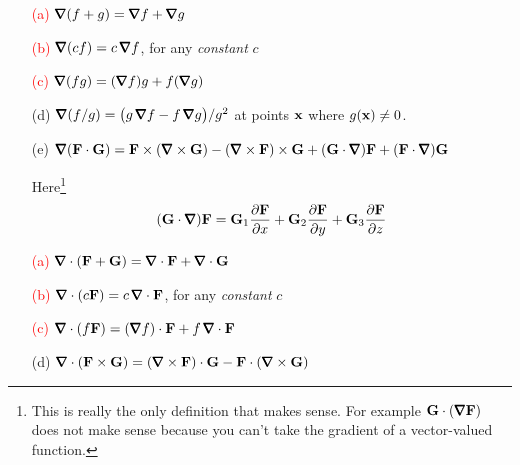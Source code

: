 \begin{theorem}\label{thm:gradIdentities}
\begin{enumerate}
\item[\textcolor{red}{(a)}]
\textcolor{red}{$\vnabla(f+g)=\vnabla f+\vnabla g$}
\item[\textcolor{red}{(b)}]
\textcolor{red}{$\vnabla(cf)=c\,\vnabla f$}, for any \emph{constant} $c$
\item[\textcolor{red}{(c)}]
\textcolor{red}{$\vnabla(fg)=(\vnabla f)g+ f(\vnabla g)$}
\item[(d)]
$\vnabla(f/g)=\big(g\,\vnabla f-f\,\vnabla g\big)/g^2$ at points $\mathbf{x}$
where $g(\mathbf{x})\ne 0$.
\item[(e)]
$\vnabla(\vF\cdot\vG)=\vF\times(\vnabla\times\vG)-
(\vnabla\times\vF)\times\vG+(\vG\cdot\vnabla)\vF+(\vF\cdot\vnabla)\vG$\ \ \ 

Here\footnote{This is really the only definition that makes sense. For example
$\vG\cdot(\vnabla\vF)$ does not make sense because you can't take the gradient 
of a vector-valued function.}
\begin{equation*}
(\vG\cdot\vnabla)\vF
=\vG_1\frac{\partial\vF}{\partial x}
 +\vG_2\frac{\partial\vF}{\partial y}
 +\vG_3\frac{\partial\vF}{\partial z}
\end{equation*}
\end{enumerate}
\end{theorem}

\begin{theorem}\label{thm:divIdentities}
\begin{enumerate}
\item[\textcolor{red}{(a)}]
\textcolor{red}{$\vnabla\cdot(\vF+\vG)=\vnabla\cdot\vF+\vnabla \cdot\vG$}
\item[\textcolor{red}{(b)}]
\textcolor{red}{$\vnabla\cdot(c\vF)=c\,\vnabla\cdot\vF$}, for any \emph{constant} $c$
\item[\textcolor{red}{(c)}]
\textcolor{red}{$\vnabla\cdot(f\vF)=(\vnabla f)\cdot\vF+ f\,\vnabla\cdot\vF$}
\item[(d)]
$\vnabla\cdot(\vF\times\vG)=(\vnabla\times\vF)\cdot\vG
                          - \vF\cdot(\vnabla\times\vG)$
\end{enumerate}
\end{theorem}


